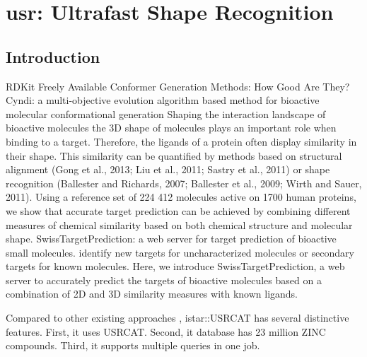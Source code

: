 \chapter{usr: Ultrafast Shape Recognition}

\section{Introduction}

RDKit
\citep{1127} Freely Available Conformer Generation Methods: How Good Are They?
\citep{1393,1394} Cyndi: a multi-objective evolution algorithm based method for bioactive molecular conformational generation
\citep{1407} Shaping the interaction landscape of bioactive molecules
\citep{1407} the 3D shape of molecules plays an important role when binding to a target. Therefore, the ligands of a protein often display similarity in their shape. This similarity can be quantified by methods based on structural alignment (Gong et al., 2013; Liu et al., 2011; Sastry et al., 2011) or shape recognition (Ballester and Richards, 2007; Ballester et al., 2009; Wirth and Sauer, 2011).
\citep{1407} Using a reference set of 224 412 molecules active on 1700 human proteins, we show that accurate target prediction can be achieved by combining different measures of chemical similarity based on both chemical structure and molecular shape.
\citep{1408} SwissTargetPrediction: a web server for target prediction of bioactive small molecules. identify new targets for uncharacterized molecules or secondary targets for known molecules. Here, we introduce SwissTargetPrediction, a web server to accurately predict the targets of bioactive molecules based on a combination of 2D and 3D similarity measures with known ligands.

Compared to other existing approaches \citep{}, istar::USRCAT has several distinctive features. First, it uses USRCAT. Second, it database has 23 million ZINC compounds. Third, it supports multiple queries in one job.

\chapterend
